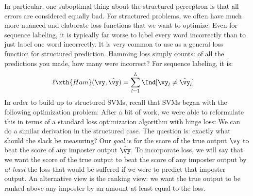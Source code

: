 In particular, one suboptimal thing about the structured perceptron is that all errors are considered equally bad.
For structured problems, we often have much more nuanced and elaborate loss functions that we want to optimize.
Even for sequence labeling, it is typically far worse to label every word incorrectly than to just label one word incorrectly.
It is very common to use  as a general loss function for structured prediction.
Hamming loss simply counts: of all the predictions you made, how many were incorrect?
For sequence labeling, it is:
\begin{align}
\ell\xth{Ham}(\vy, \hat\vy) &= \sum_{l=1}^L \Ind[ \vy_l \neq \hat \vy_l ]
\end{align}
In order to build up to structured SVMs, recall that  SVMs began with the following optimization problem:
%
%
After a bit of work, we were able to reformulate this in terms of a standard loss optimization algorithm with hinge loss:
%
%
We can do a similar derivation in the structured case.
The question is: exactly what should the slack be measuring?
Our \emph{goal} is for the score of the true output $\vy$ to beat the score of any imposter output $\hat\vy$.
To incorporate loss, we will say that we want the score of the true output to beat the score of any imposter output by \emph{at least} the loss that would be suffered if we were to predict that imposter output.
An alternative view is the ranking view: we want the true output to be ranked above any imposter by an amount at least equal to the loss.

